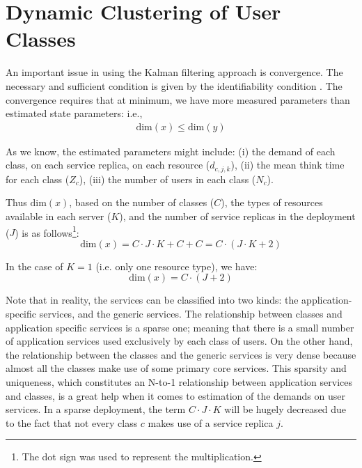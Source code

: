 	 
\section{Dynamic Clustering of User Classes}  
  An important issue in using the Kalman filtering approach is convergence. The necessary and sufficient condition is given by the identifiability condition \cite{tanizaki_nonlinear_1996,wan_unscented_2000,welch_introduction_1995}. The convergence requires that at minimum, we have more measured parameters than estimated state parameters: i.e., 
   \begin{align}  
   \text{dim}(x) \leq \text{dim}(y)    \label{eq:identifiability}
    \end{align}    

 As we know, the estimated parameters might include:   
  (i) the demand of each class, on each service replica, on each resource ($d_{c,j,k}$), 
  (ii) the mean think time for each class ($Z_c$), 
 (iii) the number of users in each class ($N_c$).  
 
	  
 Thus $\text{dim}(x)$, based on the number of classes ($C$), the types of resources available in each server ($K$), and the number of service replicas in the deployment ($J$) is as follows\footnote{The dot sign was used to represent the multiplication.}:                
 \[ \text{dim}(x)=C\cdot J\cdot K +  C + C = C\cdot (J\cdot K+2) \]
 
In the case of $K=1$ (i.e. only one resource type), we have: \[\text{dim}(x)=C\cdot (J+2)\] 

 Note that in reality, the services can be classified into two kinds: the application-specific services, and the generic services.
   The relationship between classes and application specific services is a sparse one; meaning that there is a small number of application services used exclusively by each class of users. On the other hand, the relationship between the classes and the generic services is very dense because almost all the classes make use of some primary core services. 
   This sparsity and uniqueness, which constitutes an N-to-1 relationship between application services and classes, is a great help when it comes to estimation of the demands on user services. 
 In a sparse deployment, the term $C\cdot J\cdot K$ will be hugely decreased due to the fact that not every class $c$ makes use of a service replica $j$. 
 
